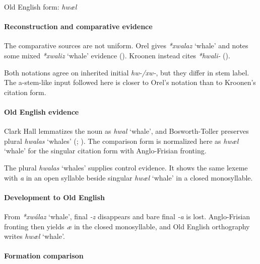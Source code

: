 \documentclass[
  british,
  a4paper,
]{article}
\providecommand{\Recon}[1]{\emph{*#1}}
\begin{document}
Old English form: \emph{hwæl}

\paragraph{Reconstruction and comparative
evidence}\label{reconstruction-and-comparative-evidence-112}

The comparative sources are not uniform. Orel gives \Recon{xwalaz}
`whale' and notes some mixed \Recon{xwaliz} `whale' evidence
(). Kroonen instead cites
{\emph{*hwali-}} ().

Both notations agree on inherited initial \emph{hw-/xw-}, but they
differ in stem label. The a-stem-like input followed here is closer to
Orel's notation than to Kroonen's citation form.

\paragraph{Old English evidence}\label{old-english-evidence-112}

Clark Hall lemmatizes the noun as {\emph{hwal}} `whale', and
Bosworth-Toller preserves plural {\emph{hwalas}} `whales'
(;
). The
comparison form is normalized here as {\emph{hwæl}} `whale' for the
singular citation form with Anglo-Frisian fronting.

The plural {\emph{hwalas}} `whales' supplies control evidence. It shows
the same lexeme with \emph{a} in an open syllable beside singular
{\emph{hwæl}} `whale' in a closed monosyllable.

\paragraph{Development to Old
English}\label{development-to-old-english-112}

From \Recon{xwálaz} `whale', final \emph{-z} disappears and bare final
\emph{-a} is lost. Anglo-Frisian fronting then yields \emph{æ} in the
closed monosyllable, and Old English orthography writes {\emph{hwæl}}
`whale'.

\paragraph{Formation comparison}\label{formation-comparison-7}
\end{document}
